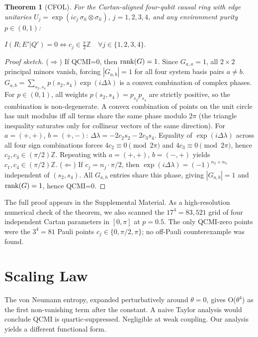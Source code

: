 \documentclass[twocolumn,aps,prl,floatfix]{revtex4-2}
\newtheorem{theorem}{Theorem}
\begin{document}
\begin{theorem}[CFOL]
For the Cartan-aligned four-qubit causal ring with edge unitaries $U_j=\exp(i c_j\,\sigma_{\hat{n}}\otimes\sigma_{\hat{n}})$, $j=1,2,3,4$, and any environment purity $p\in(0,1)$:

$I(R;E'|Q') = 0 \iff c_j \in \frac{\pi}{2}\mathbb{Z} \quad \forall j \in \{1,2,3,4\}.$
\end{theorem}

\begin{proof}[Proof sketch]
($\Rightarrow$) If QCMI=0, then ${\rm rank}(G)=1$. Since $G_{a,a}=1$, all $2\times 2$ principal minors vanish, forcing $|G_{a,b}|=1$ for all four system basis pairs $a\neq b$. $G_{a,b}=\sum_{s_2,s_4} p(s_2,s_4)\exp(i\Delta\lambda)$ is a convex combination of complex phases. For $p\in(0,1)$, all weights $p(s_2,s_4)=p_{s_2}p_{s_4}$ are strictly positive, so the combination is non-degenerate. A convex combination of points on the unit circle has unit modulus iff all terms share the same phase modulo $2\pi$ (the triangle inequality saturates only for collinear vectors of the same direction). For $a=(+,+)$, $b=(+,-)$: $\Delta\lambda=-2c_2 s_2-2c_3 s_4$. Equality of $\exp(i\Delta\lambda)$ across all four sign combinations forces $4c_2\equiv0\pmod{2\pi}$ and $4c_3\equiv0\pmod{2\pi}$, hence $c_2,c_3\in(\pi/2)\mathbb{Z}$. Repeating with $a=(+,+)$, $b=(-,+)$ yields $c_1,c_4\in(\pi/2)\mathbb{Z}$. ($\Leftarrow$) If $c_j=n_j\!\cdot\!\pi/2$, then $\exp(i\Delta\lambda)=(-1)^{n_2+n_3}$ independent of $(s_2,s_4)$. All $G_{a,b}$ entries share this phase, giving $|G_{a,b}|=1$ and ${\rm rank}(G)=1$, hence QCMI=0.
\end{proof}

The full proof appears in the Supplemental Material. As a high-resolution numerical check of the theorem, we also scanned the $17^4=83,521$ grid of four independent Cartan parameters in $[0,\pi]$ at $p=0.5$. The only QCMI-zero points were the $3^4=81$ Pauli points $c_j\in\{0,\pi/2,\pi\}$; no off-Pauli counterexample was found.

\section{Scaling Law}

The von Neumann entropy, expanded perturbatively around $\theta=0$, gives O($\theta^4$) as the first non-vanishing term after the constant. A naive Taylor analysis would conclude QCMI is quartic-suppressed. Negligible at weak coupling. Our analysis yields a different functional form.
\end{document}
